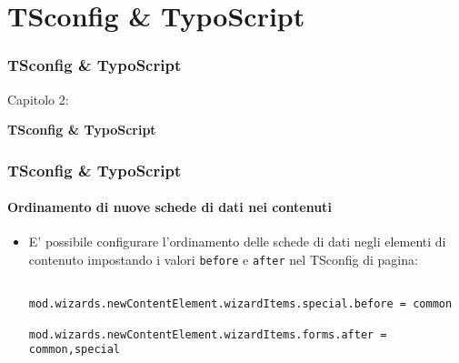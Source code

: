 %

\section{TSconfig \& TypoScript}
\begin{frame}[fragile]
	\frametitle{TSconfig \& TypoScript}

	\begin{center}\huge{Capitolo 2:}\end{center}
	\begin{center}\huge{\color{typo3darkgrey}\textbf{TSconfig \& TypoScript}}\end{center}

\end{frame}

\begin{frame}[fragile]
	\frametitle{TSconfig \& TypoScript}
	\framesubtitle{Ordinamento di nuove schede di dati nei contenuti}

	\lstset{basicstyle=\tiny\ttfamily}

	\begin{itemize}
		\item E' possibile configurare l'ordinamento delle schede di dati negli elementi di contenuto
			impostando i valori \texttt{before} e \texttt{after} nel TSconfig di pagina:

			\begin{lstlisting}
				mod.wizards.newContentElement.wizardItems.special.before = common
				mod.wizards.newContentElement.wizardItems.forms.after = common,special
			\end{lstlisting}

	\end{itemize}

\end{frame}

